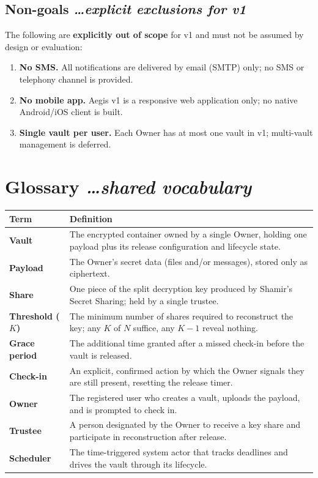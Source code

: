 \documentclass[11pt,a4paper]{article}
\newcommand{\BvrHint}[1]{%
  {\normalfont\normalsize\itshape\hfill #1}}
\begin{document}
\subsection{Non-goals \BvrHint{\ldots explicit exclusions for v1}}
The following are \textbf{explicitly out of scope} for v1 and must not be
assumed by design or evaluation:
\begin{enumerate}[leftmargin=0.9cm,label=\textbf{NG-\arabic*.}]
  \item \textbf{No SMS.} All notifications are delivered by email (SMTP) only;
    no SMS or telephony channel is provided.
  \item \textbf{No mobile app.} Aegis v1 is a responsive web application only;
    no native Android/iOS client is built.
  \item \textbf{Single vault per user.} Each Owner has at most one vault in v1;
    multi-vault management is deferred.
\end{enumerate}

\section{Glossary \BvrHint{\ldots shared vocabulary}}
\begin{longtable}{>{\raggedright\arraybackslash}p{}%
    >{\raggedright\arraybackslash}p{}}
  \textbf{Term} & \textbf{Definition} \\ \hline \endhead
  \textbf{Vault} & The encrypted container owned by a single Owner, holding one
    payload plus its release configuration and lifecycle state. \\
  \textbf{Payload} & The Owner's secret data (files and/or messages), stored
    only as ciphertext. \\
  \textbf{Share} & One piece of the split decryption key produced by Shamir's
    Secret Sharing; held by a single trustee. \\
  \textbf{Threshold ($K$)} & The minimum number of shares required to
    reconstruct the key; any $K$ of $N$ suffice, any $K-1$ reveal nothing. \\
  \textbf{Grace period} & The additional time granted after a missed check-in
    before the vault is released. \\
  \textbf{Check-in} & An explicit, confirmed action by which the Owner signals
    they are still present, resetting the release timer. \\
  \textbf{Owner} & The registered user who creates a vault, uploads the
    payload, and is prompted to check in. \\
  \textbf{Trustee} & A person designated by the Owner to receive a key share
    and participate in reconstruction after release. \\
  \textbf{Scheduler} & The time-triggered system actor that tracks deadlines
    and drives the vault through its lifecycle. \\
\end{longtable}
\end{document}
